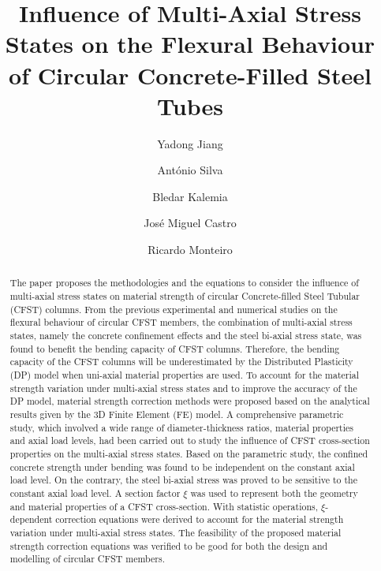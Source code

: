 \documentclass[12pt, A4]{article}
\title{Influence of Multi-Axial Stress States on the Flexural Behaviour of Circular Concrete-Filled Steel Tubes}
\author{Yadong Jiang \and António Silva \and Bledar Kalemia \and José Miguel Castro \and Ricardo Monteiro}
\date{}
\begin{document}
	\maketitle
	
	\begin{abstract}
		The paper proposes the methodologies and the equations to consider the influence of multi-axial stress states on material strength of circular Concrete-filled Steel Tubular (CFST) columns. From the previous experimental and numerical studies on the flexural behaviour of circular CFST members, the combination of multi-axial stress states, namely the concrete confinement effects and the steel bi-axial stress state, was found to benefit the bending capacity of CFST columns. Therefore, the bending capacity of the CFST columns will be underestimated by the Distributed Plasticity (DP) model when uni-axial material properties are used. To account for the material strength variation under multi-axial stress states and to improve the accuracy of the DP model, material strength correction methods were proposed based on the analytical results given by the 3D Finite Element (FE) model. A comprehensive parametric study, which involved a wide range of diameter-thickness ratios, material properties and axial load levels, had been carried out to study the influence of CFST cross-section properties on the multi-axial stress states. Based on the parametric study, the confined concrete strength under bending was found to be independent on the constant axial load level. On the contrary, the steel bi-axial stress was proved to be sensitive to the constant axial load level. A section factor $\xi$ was used to represent both the geometry and material properties of a CFST cross-section. With statistic operations, $\xi$-dependent correction equations were derived to account for the material strength variation under multi-axial stress states. The feasibility of the proposed material strength correction equations was verified to be good for both the design and modelling of circular CFST members.
	\end{abstract}
\end{document}
